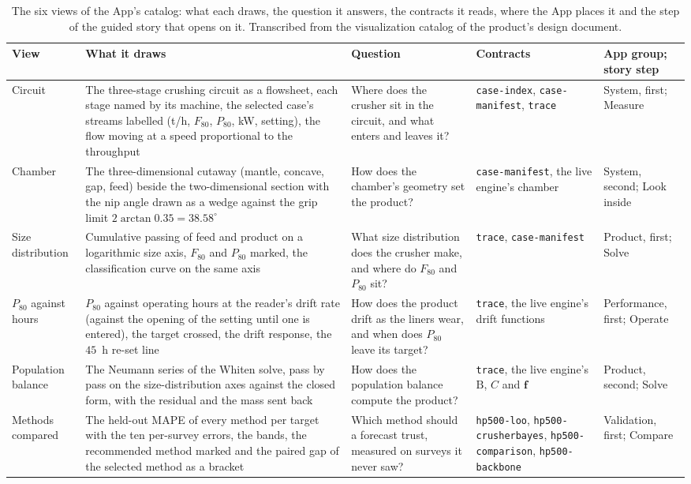 \begin{table}[!t]
\centering
\caption{The six views of the App's catalog: what each draws, the question it answers, the contracts it reads, where the App places it
and the step of the guided story that opens on it. Transcribed from the visualization catalog of the product's design document.}
\label{tab:views}
\scriptsize
\begin{tabular}{@{}p{} p{} p{} p{} p{}@{}}
\toprule
View & What it draws & Question & Contracts & App group; story step \\
\midrule
Circuit & The three-stage crushing circuit as a flowsheet, each stage named by its machine, the selected case's streams labelled
(t/h, $F_{80}$, $P_{80}$, kW, setting), the flow moving at a speed proportional to the throughput & Where does the crusher sit in the
circuit, and what enters and leaves it? & \texttt{case-index}, \texttt{case-manifest}, \texttt{trace} & System, first; Measure \\
Chamber & The three-dimensional cutaway (mantle, concave, gap, feed) beside the two-dimensional section with the nip angle drawn as a
wedge against the grip limit $2\arctan0.35=38.58^\circ$ & How does the chamber's geometry set the product? & \texttt{case-manifest}, the
live engine's chamber & System, second; Look inside \\
Size distribution & Cumulative passing of feed and product on a logarithmic size axis, $F_{80}$ and $P_{80}$ marked, the classification
curve on the same axis & What size distribution does the crusher make, and where do $F_{80}$ and $P_{80}$ sit? & \texttt{trace},
\texttt{case-manifest} & Product, first; Solve \\
$P_{80}$ against hours & $P_{80}$ against operating hours at the reader's drift rate (against the opening of the setting until one is entered), the target
crossed, the drift response, the $45$~h re-set line & How does the product drift as the liners wear, and when does $P_{80}$ leave its
target? & \texttt{trace}, the live engine's drift functions & Performance, first; Operate \\
Population balance & The Neumann series of the Whiten solve, pass by pass on the size-distribution axes against the closed form, with
the residual and the mass sent back & How does the population balance compute the product? & \texttt{trace}, the live engine's $\mathrm B$,
$C$ and $\mathbf f$ & Product, second; Solve \\
Methods compared & The held-out MAPE of every method per target with the ten per-survey errors, the bands, the recommended method marked
and the paired gap of the selected method as a bracket & Which method should a forecast trust, measured on surveys it never saw? &
\texttt{hp500-loo}, \texttt{hp500-crusherbayes}, \texttt{hp500-comparison}, \texttt{hp500-backbone} & Validation, first; Compare \\
\bottomrule
\end{tabular}
\end{table}

